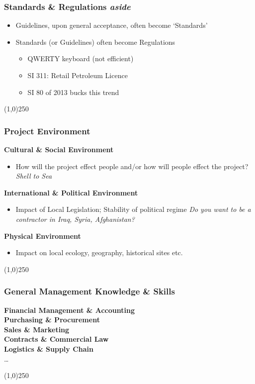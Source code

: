 \begin{frame}
\frametitle{Standards \& Regulations \hfill \textit{aside}}
\begin{itemize}
\item Guidelines, upon general acceptance, often become `Standards'
\item Standards (or Guidelines) often become Regulations
		\begin{itemize}
		\item QWERTY keyboard (not efficient)
		\item SI 311: Retail Petroleum Licence
		\item SI 80 of 2013 bucks this trend
		\end{itemize}
\end{itemize}
\end{frame}
\begin{center}\line(1,0){250}\end{center}



\begin{frame}
\frametitle{Project Environment}
\textbf{Cultural \& Social Environment}\\
\begin{itemize}
	\item How will the project effect people and/or how will people effect the project? \textit{Shell to Sea}
\end{itemize}
\textbf{International \& Political Environment}\\
\begin{itemize}
	\item Impact of Local Legislation; Stability of political regime \textit{Do you want to be a contractor in Iraq, Syria, Afghanistan?}
\end{itemize}
\textbf{Physical Environment }\\
\begin{itemize}
	\item Impact on local ecology, geography, historical sites etc. 
\end{itemize}
\end{frame}
\begin{center}\line(1,0){250}\end{center}



\begin{frame}
\frametitle{General Management Knowledge \& Skills}
\textbf{Financial Management \& Accounting}\\
\textbf{Purchasing \& Procurement}\\
\textbf{Sales \& Marketing}\\
\textbf{Contracts \& Commercial Law}\\
\textbf{Logistics \& Supply Chain}\\
\ldots 
\end{frame}
\begin{center}\line(1,0){250}\end{center}




